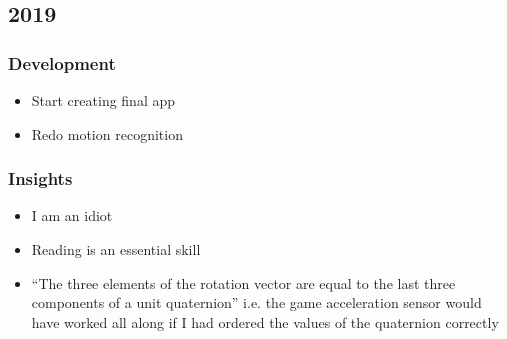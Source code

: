 \documentclass{article}
\begin{document}
    \subsection{2019}
    \subsubsection{Development}
    \begin{itemize}
    \item Start creating final app
      \item Redo motion recognition
      \end{itemize}
      \subsubsection{Insights}
      \begin{itemize}
      \item I am an idiot
      \item Reading is an essential skill
      \item ``The three elements of the rotation vector are equal to the last three components of a unit quaternion'' i.e. the game acceleration sensor would have worked all along if I had ordered the values of the quaternion correctly
        \end{itemize}
\end{document}

